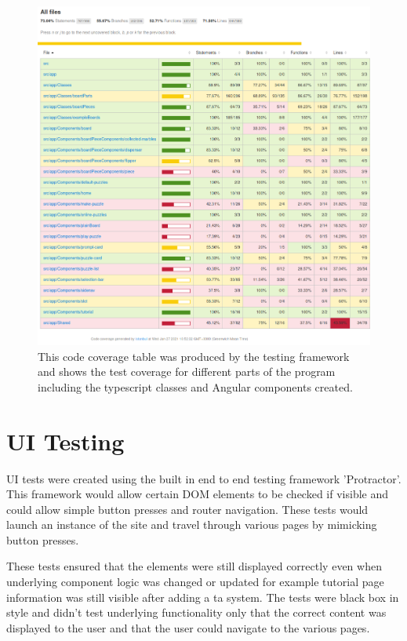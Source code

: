 \documentclass{l4proj}
\begin{document}
\begin{figure}
    \centering
    \includegraphics[width=1\linewidth]{images/codeCoverage.png}    

    \caption{This code coverage table was produced by the testing framework and shows the test coverage for different parts of the program including the typescript classes and Angular components created.}

    \label{fig:codeCoverage} 
\end{figure}

\section{UI Testing}
UI tests were created using the built in end to end testing framework 'Protractor'. This framework would allow certain DOM elements to be checked if visible and could allow simple button presses and router navigation. These tests would launch an instance of the site and travel through various pages by mimicking button presses. 

These tests ensured that the elements were still displayed correctly even when underlying component logic was changed or updated for example tutorial page information was still visible after adding a ta system. The tests were black box in style and didn't test underlying functionality only that the correct content was displayed to the user and that the user could navigate to the various pages. 
\end{document}
